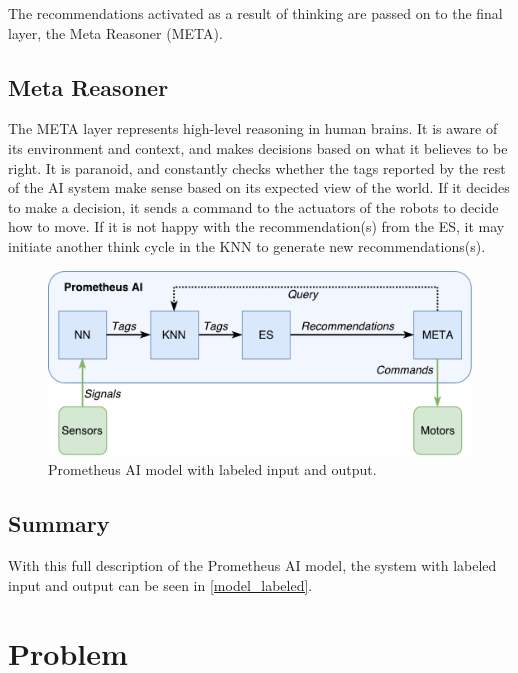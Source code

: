 \documentclass[titlepage,11pt]{article}
\begin{document}
The recommendations activated as a result of thinking are passed on to the final layer, the Meta Reasoner (META).

\subsection{Meta Reasoner}

The META layer represents high-level reasoning in human brains. It is aware of its environment and context, and makes decisions based on what it believes to be right. It is paranoid, and constantly checks whether the tags reported by the rest of the AI system make sense based on its expected view of the world. If it decides to make a decision, it sends a command to the actuators of the robots to decide how to move. If it is not happy with the recommendation(s) from the ES, it may initiate another think cycle in the KNN to generate new recommendations(s).

\begin{figure}[!htb]
	\includegraphics[width=\textwidth]{figures/ai_model_labeled.pdf}
	\caption{Prometheus AI model with labeled input and output.}
	\label{model_labeled}
\end{figure}

\subsection{Summary}

With this full description of the Prometheus AI model, the system with labeled input and output can be seen in \autoref{model_labeled}.

\section{Problem}
\end{document}
